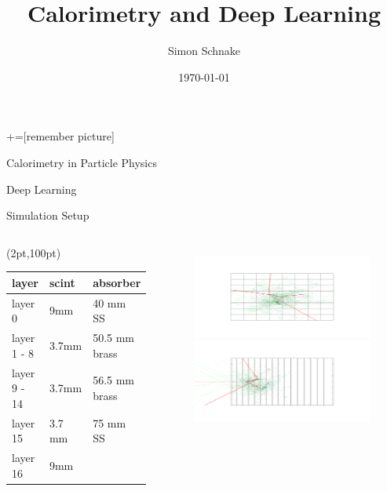 \documentclass[10pt]{beamer}
\title{Calorimetry and Deep Learning}
\date{\today}
\author{Simon Schnake}
\institute{Universität Hamburg}
\begin{document}
\maketitle
{}+=[remember picture]
\begin{frame}{Calorimetry in Particle Physics}

\end{frame}

\begin{frame}{Deep Learning}

\end{frame}

\begin{frame}{Simulation Setup}
  \begin{columns}
    \begin{textblock*}{10pt}(2pt,100pt)
      \begin{tabular}{l|l|l}
        layer  & scint    & absorber \\ \hline
        layer 0      & 9mm     & 40 mm SS\\
        layer 1 - 8  & 3.7mm   & 50.5 mm brass        \\
        layer 9 - 14 & 3.7mm   & 56.5 mm brass         \\
        layer 15     & 3.7 mm  & 75 mm SS \\
        layer 16     & 9mm     &                      
      \end{tabular}
    \end{textblock*}
    \begin{figure}[htp]
      \includegraphics[width=1.2\textwidth]{front.png}
      \includegraphics[width=1.2\textwidth]{side.png}
    \end{figure}
  \end{columns}
\end{frame}
\end{document}
